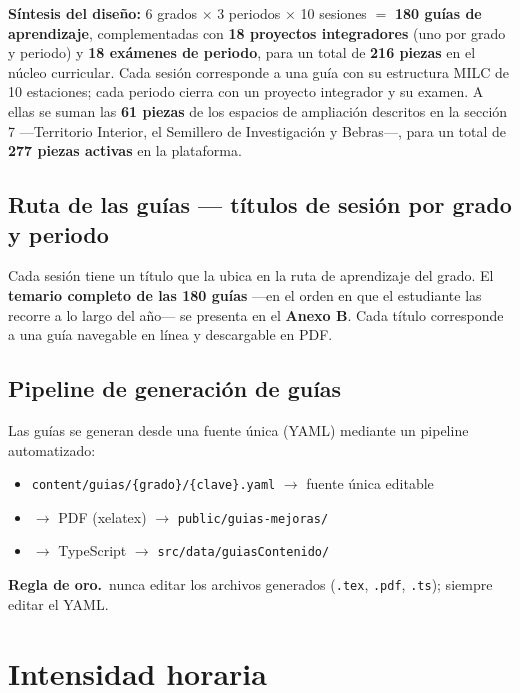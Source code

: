 \documentclass[12pt, a4paper]{article}
\newcommand{\callout}[2]{%
  \begin{tcolorbox}[enhanced, colback=vinoClaro, colframe=vinoInst, boxrule=0pt,
    leftrule=3.5pt, arc=2pt, left=11pt, right=11pt, top=8pt, bottom=8pt]
  {\color{vinoInst}\textbf{#1}}\, #2
  \end{tcolorbox}}
\begin{document}
\noindent\textbf{Síntesis del diseño:} 6 grados $\times$ 3 periodos $\times$ 10
sesiones $=$ \textbf{180 guías de aprendizaje}, complementadas con \textbf{18
proyectos integradores} (uno por grado y periodo) y \textbf{18 exámenes de periodo},
para un total de \textbf{216 piezas} en el núcleo curricular. Cada sesión
corresponde a una guía con su estructura MILC de 10 estaciones; cada periodo cierra
con un proyecto integrador y su examen. A ellas se suman las \textbf{61 piezas} de
los espacios de ampliación descritos en la sección\,7 —Territorio Interior, el
Semillero de Investigación y Bebras—, para un total de \textbf{277 piezas activas}
en la plataforma.

\subsection{Ruta de las guías — títulos de sesión por grado y periodo}

Cada sesión tiene un título que la ubica en la ruta de aprendizaje del grado. El
\textbf{temario completo de las 180 guías} —en el orden en que el estudiante las
recorre a lo largo del año— se presenta en el \textbf{Anexo B}. Cada título
corresponde a una guía navegable en línea y descargable en PDF.

\subsection{Pipeline de generación de guías}

Las guías se generan desde una fuente única (YAML) mediante un pipeline automatizado:

\begin{itemize}
  \item \texttt{content/guias/\{grado\}/\{clave\}.yaml} $\rightarrow$ fuente única editable
  \item $\rightarrow$ PDF (xelatex) $\rightarrow$ \texttt{public/guias-mejoras/}
  \item $\rightarrow$ TypeScript $\rightarrow$ \texttt{src/data/guiasContenido/}
\end{itemize}

\callout{Regla de oro.}{nunca editar los archivos generados (\texttt{.tex},
\texttt{.pdf}, \texttt{.ts}); siempre editar el YAML.}

\section{Intensidad horaria}
\end{document}
